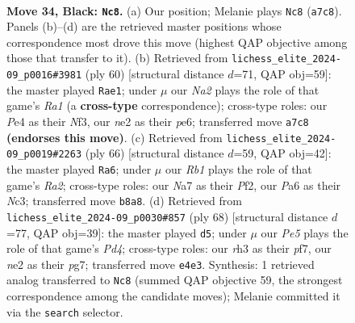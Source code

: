 \documentclass[11pt]{article}
\begin{document}
\clearpage

\begin{figure}[p]\centering
\begin{subfigure}{0.46\textwidth}\centering
\resizebox{\linewidth}{!}{%
\newchessgame
\chessboard[
  setfen={1r6/n3rk2/p2p2p1/3P3p/Rpq1p2P/7R/3QNPP1/5K2 b - - 0 34},
  showmover=false,
  pgfstyle=straightmove, color=movearrow, markmove={a7-c8}
]}
\caption{}
\end{subfigure}\hfill
\begin{subfigure}{0.46\textwidth}\centering
\resizebox{\linewidth}{!}{%
\newchessgame
\chessboard[
  setfen={2r5/p4k2/1p1qppn1/8/3P4/1Q3NPr/PP3K2/R5R1 w - - 0 31},
  showmover=false,
  pgfstyle=straightmove, color=movearrow, markmove={a1-e1}
]}
\caption{}
\end{subfigure}
\\[4pt]
\begin{subfigure}{0.46\textwidth}\centering
\resizebox{\linewidth}{!}{%
\newchessgame
\chessboard[
  setfen={r5k1/P2q1p2/3n2p1/2pPQ2p/1r6/2N5/RP3PP1/4R1K1 w - - 1 34},
  showmover=false,
  pgfstyle=straightmove, color=movearrow, markmove={a2-a6}
]}
\caption{}
\end{subfigure}\hfill
\begin{subfigure}{0.46\textwidth}\centering
\resizebox{\linewidth}{!}{%
\newchessgame
\chessboard[
  setfen={4r1k1/5pp1/7q/7P/1PpP2Q1/r1P1p3/P1R5/1K3R2 w - - 0 35},
  showmover=false,
  pgfstyle=straightmove, color=movearrow, markmove={d4-d5}
]}
\caption{}
\end{subfigure}
\caption{\textbf{Move 34, Black: \texttt{Nc8}.} (a) Our position; Melanie plays \texttt{Nc8} (\texttt{a7c8}). Panels (b)--(d) are the retrieved master positions whose correspondence most drove this move (highest QAP objective among those that transfer to it). (b) Retrieved from \texttt{lichess\_elite\_2024-09\_p0016\#3981} (ply 60) [structural distance $d$=71, QAP obj=59]: the master played \texttt{Rae1}; under $\mu$ our \emph{Na2} plays the role of that game's \emph{Ra1} (a \textbf{cross-type} correspondence); cross-type roles: our \emph{P}e4 as their \emph{N}f3, our \emph{n}e2 as their \emph{p}e6; transferred move \texttt{a7c8} \textbf{(endorses this move)}. (c) Retrieved from \texttt{lichess\_elite\_2024-09\_p0019\#2263} (ply 66) [structural distance $d$=59, QAP obj=42]: the master played \texttt{Ra6}; under $\mu$ our \emph{Rb1} plays the role of that game's \emph{Ra2}; cross-type roles: our \emph{N}a7 as their \emph{P}f2, our \emph{P}a6 as their \emph{N}c3; transferred move \texttt{b8a8}. (d) Retrieved from \texttt{lichess\_elite\_2024-09\_p0030\#857} (ply 68) [structural distance $d$=77, QAP obj=39]: the master played \texttt{d5}; under $\mu$ our \emph{Pe5} plays the role of that game's \emph{Pd4}; cross-type roles: our \emph{r}h3 as their \emph{p}f7, our \emph{n}e2 as their \emph{p}g7; transferred move \texttt{e4e3}. Synthesis: 1 retrieved analog transferred to \texttt{Nc8} (summed QAP objective 59, the strongest correspondence among the candidate moves); Melanie committed it via the \texttt{search} selector.}
\label{fig:thought-m67}
\end{figure}
\end{document}
